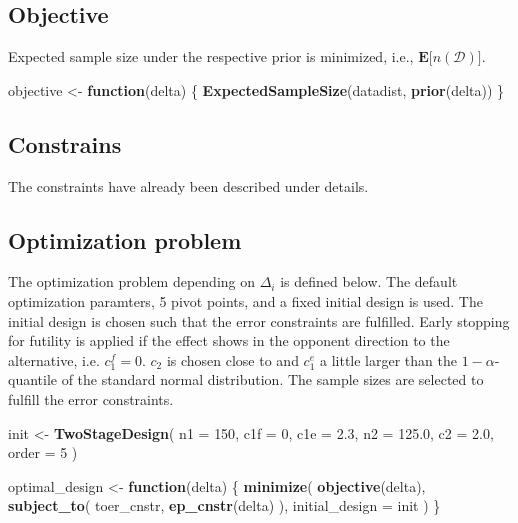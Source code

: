 \documentclass[]{book}
\newenvironment{Shaded}{\begin{snugshade}}{\end{snugshade}}
\newcommand{\ControlFlowTok}[1]{\textcolor[rgb]{0.13,0.29,0.53}{\textbf{#1}}}
\newcommand{\DataTypeTok}[1]{\textcolor[rgb]{0.13,0.29,0.53}{#1}}
\newcommand{\DecValTok}[1]{\textcolor[rgb]{0.00,0.00,0.81}{#1}}
\newcommand{\FloatTok}[1]{\textcolor[rgb]{0.00,0.00,0.81}{#1}}
\newcommand{\KeywordTok}[1]{\textcolor[rgb]{0.13,0.29,0.53}{\textbf{#1}}}
\newcommand{\NormalTok}[1]{#1}
\newcommand{\StringTok}[1]{\textcolor[rgb]{0.31,0.60,0.02}{#1}}
\begin{document}
\hypertarget{objective-6}{%
\subsection{Objective}\label{objective-6}}

Expected sample size under the respective prior is minimized, i.e.,
\(\boldsymbol{E}\big[n(\mathcal{D})\big]\).

\begin{Shaded}
\begin{Highlighting}[]
\NormalTok{objective <-}\StringTok{ }\ControlFlowTok{function}\NormalTok{(delta) \{}
    \KeywordTok{ExpectedSampleSize}\NormalTok{(datadist, }\KeywordTok{prior}\NormalTok{(delta))}
\NormalTok{\}}
\end{Highlighting}
\end{Shaded}

\hypertarget{constrains-6}{%
\subsection{Constrains}\label{constrains-6}}

The constraints have already been described under details.

\hypertarget{optimization-problem}{%
\subsection{Optimization problem}\label{optimization-problem}}

The optimization problem depending on \(\Delta_i\) is defined below.
The default optimization paramters, 5 pivot points, and a fixed initial design
is used.
The initial design is chosen such that the error constraints are
fulfilled. Early stopping for futility is applied if the effect shows
in the opponent direction to the alternative, i.e. \(c_1^f=0\).
\(c_2\) is chosen close to and \(c_1^e\) a little larger than the \(1-\alpha\)-quantile
of the standard normal distribution. The sample sizes are selected
to fulfill the error constraints.

\begin{Shaded}
\begin{Highlighting}[]
\NormalTok{init <-}\StringTok{ }\KeywordTok{TwoStageDesign}\NormalTok{(}
    \DataTypeTok{n1    =} \DecValTok{150}\NormalTok{,}
    \DataTypeTok{c1f   =} \DecValTok{0}\NormalTok{,}
    \DataTypeTok{c1e   =} \FloatTok{2.3}\NormalTok{,}
    \DataTypeTok{n2    =} \FloatTok{125.0}\NormalTok{,}
    \DataTypeTok{c2    =} \FloatTok{2.0}\NormalTok{,}
    \DataTypeTok{order =} \DecValTok{5}
\NormalTok{)}

\NormalTok{optimal_design <-}\StringTok{ }\ControlFlowTok{function}\NormalTok{(delta) \{}
    \KeywordTok{minimize}\NormalTok{(}
        \KeywordTok{objective}\NormalTok{(delta),}
        \KeywordTok{subject_to}\NormalTok{(}
\NormalTok{            toer_cnstr,}
            \KeywordTok{ep_cnstr}\NormalTok{(delta)}
\NormalTok{        ),}
        \DataTypeTok{initial_design =}\NormalTok{ init}
\NormalTok{    )}
\NormalTok{\}}
\end{Highlighting}
\end{Shaded}
\end{document}
